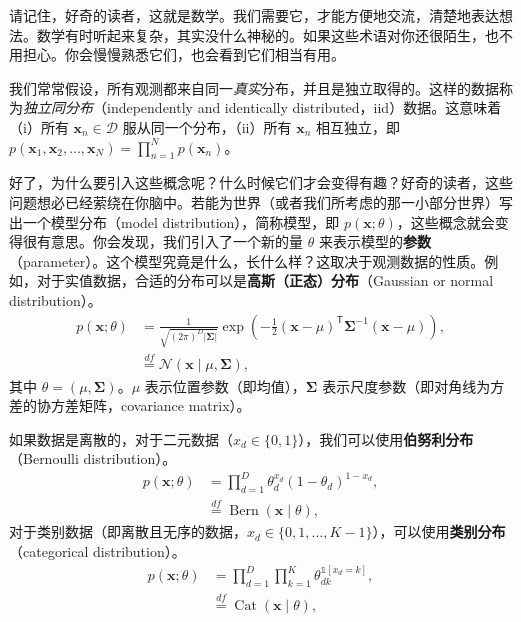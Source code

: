 请记住，好奇的读者，这就是数学。我们需要它，才能方便地交流，清楚地表达想法。数学有时听起来复杂，其实没什么神秘的。如果这些术语对你还很陌生，也不用担心。你会慢慢熟悉它们，也会看到它们相当有用。

我们常常假设，所有观测都来自同一\emph{真实}分布，并且是独立取得的。这样的数据称为\emph{独立同分布}（independently and identically distributed，iid）数据。这意味着（i）所有 $\mathbf{x}_n\in\mathcal{D}$ 服从同一个分布，（ii）所有 $\mathbf{x}_n$ 相互独立，即 $p(\mathbf{x}_1,\mathbf{x}_2,\ldots,\mathbf{x}_N)=\prod_{n=1}^{N}p(\mathbf{x}_n)$。

好了，为什么要引入这些概念呢？什么时候它们才会变得有趣？好奇的读者，这些问题想必已经萦绕在你脑中。若能为世界（或者我们所考虑的那一小部分世界）写出一个模型分布（model distribution），简称模型，即 $p(\mathbf{x};\theta)$，这些概念就会变得很有意思。你会发现，我们引入了一个新的量 $\theta$ 来表示模型的\textbf{参数}（parameter）。这个模型究竟是什么，长什么样？这取决于观测数据的性质。例如，对于实值数据，合适的分布可以是\textbf{高斯（正态）分布}（Gaussian or normal distribution）。
\begin{align}
p(\mathbf{x};\theta)
 &= \frac{1}{\sqrt{(2\pi)^D|\boldsymbol{\Sigma}|}}
    \exp\!\left(-\frac12(\mathbf{x}-\mu)^{\mathsf T}
       \boldsymbol{\Sigma}^{-1}(\mathbf{x}-\mu)\right),
       \tag{2.2}\label{eq:02-02}\\
 &\overset{\mathit{df}}{=} \mathcal{N}(\mathbf{x}\mid\mu,\boldsymbol{\Sigma}),
       \tag{2.3}\label{eq:02-03}
\end{align}
其中 $\theta=(\mu,\boldsymbol{\Sigma})$。$\mu$ 表示位置参数（即均值），$\boldsymbol{\Sigma}$ 表示尺度参数（即对角线为方差的协方差矩阵，covariance matrix）。

如果数据是离散的，对于二元数据（$x_d\in\{0,1\}$），我们可以使用\textbf{伯努利分布}（Bernoulli distribution）。
\begin{align}
p(\mathbf{x};\theta)&=\prod_{d=1}^{D}\theta_d^{x_d}(1-\theta_d)^{1-x_d},
   \tag{2.4}\label{eq:02-04}\\
 &\overset{\mathit{df}}{=}\operatorname{Bern}(\mathbf{x}\mid\theta),
   \tag{2.5}\label{eq:02-05}
\end{align}
对于类别数据（即离散且无序的数据，$x_d\in\{0,1,\ldots,K-1\}$），可以使用\textbf{类别分布}（categorical distribution）。
\begin{align}
p(\mathbf{x};\theta)
 &=\prod_{d=1}^{D}\prod_{k=1}^{K}\theta_{dk}^{\mathbb{1}[x_d=k]},
     \tag{2.6}\label{eq:02-06}\\
 &\overset{\mathit{df}}{=}\operatorname{Cat}(\mathbf{x}\mid\theta),
     \tag{2.7}\label{eq:02-07}
\end{align}

